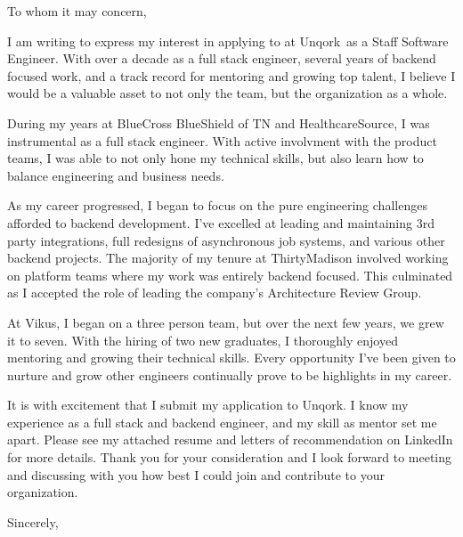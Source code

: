 
\usepackage{parskip}

\newcommand{\applyteam}{Event Storage Platform}
\newcommand{\applycompany}{Unqork}
\newcommand{\applyrole}{Staff Software Engineer}





To whom it may concern,

I am writing to express my interest in applying to at \applycompany\ as a \applyrole.
With over a decade as a full stack engineer, several years of backend focused work, and a track record for
mentoring and growing top talent, I believe I would be a valuable asset to not only the team, but the
organization as a whole.

During my years at BlueCross BlueShield of TN and HealthcareSource, I was instrumental as a full stack
engineer. With active involvment with the product teams, I was able to not only hone my technical skills,
but also learn how to balance engineering and business needs.

As my career progressed, I began to focus on the pure engineering challenges afforded to backend development.
I've excelled at leading and maintaining 3rd party integrations, full redesigns of asynchronous job systems,
and various other backend projects. The majority of my tenure at ThirtyMadison involved working on platform
teams where my work was entirely backend focused. This culminated as I accepted the role of leading the
company's Architecture Review Group.

At Vikus, I began on a three person team, but over the next few years, we grew it to seven. With the hiring 
of two new graduates, I thoroughly enjoyed mentoring and growing their technical skills. Every opportunity
I've been given to nurture and grow other engineers continually prove to be highlights in my career.

It is with excitement that I submit my application to \applycompany. I know my experience as a
full stack and backend engineer, and my skill as mentor set me apart. Please see my attached resume and
letters of recommendation on LinkedIn for more details. Thank you for your consideration and I look forward
to meeting and discussing with you how best I could join and contribute to your organization.

\hfill \break
Sincerely,\\
\name

